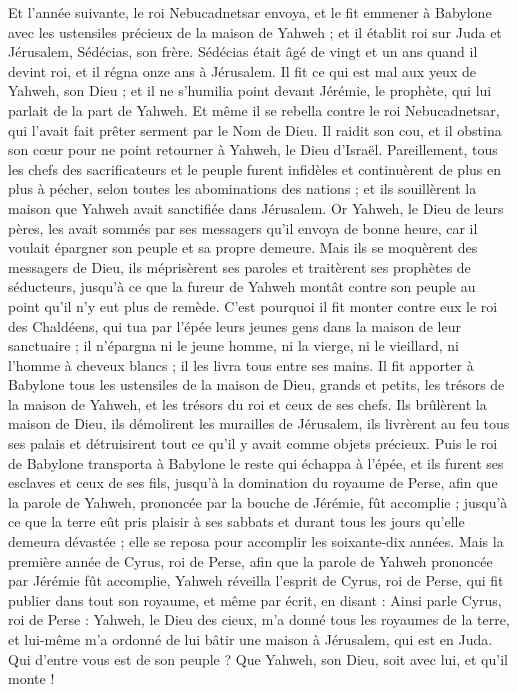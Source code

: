 \begin{multicols}{2}
Et l'année suivante, le roi Nebucadnetsar envoya, et le fit emmener à Babylone avec les ustensiles précieux de la maison de Yahweh ; et il établit roi sur Juda et Jérusalem, Sédécias, son frère.
Sédécias était âgé de vingt et un ans quand il devint roi, et il régna onze ans à Jérusalem.
Il fit ce qui est mal aux yeux de Yahweh, son Dieu ; et il ne s'humilia point devant Jérémie, le prophète, qui lui parlait de la part de Yahweh.
Et même il se rebella contre le roi Nebucadnetsar, qui l'avait fait prêter serment par le Nom de Dieu. Il raidit son cou, et il obstina son cœur pour ne point retourner à Yahweh, le Dieu d'Israël.
Pareillement, tous les chefs des sacrificateurs et le peuple furent infidèles et continuèrent de plus en plus à pécher, selon toutes les abominations des nations ; et ils souillèrent la maison que Yahweh avait sanctifiée dans Jérusalem.
Or Yahweh, le Dieu de leurs pères, les avait sommés par ses messagers qu'il envoya de bonne heure, car il voulait épargner son peuple et sa propre demeure.
Mais ils se moquèrent des messagers de Dieu, ils méprisèrent ses paroles et traitèrent ses prophètes de séducteurs, jusqu'à ce que la fureur de Yahweh montât contre son peuple au point qu'il n'y eut plus de remède.
C'est pourquoi il fit monter contre eux le roi des Chaldéens, qui tua par l'épée leurs jeunes gens dans la maison de leur sanctuaire ; il n'épargna ni le jeune homme, ni la vierge, ni le vieillard, ni l'homme à cheveux blancs ; il les livra tous entre ses mains.
Il fit apporter à Babylone tous les ustensiles de la maison de Dieu, grands et petits, les trésors de la maison de Yahweh, et les trésors du roi et ceux de ses chefs.
Ils brûlèrent la maison de Dieu, ils démolirent les murailles de Jérusalem, ils livrèrent au feu tous ses palais et détruisirent tout ce qu'il y avait comme objets précieux.
Puis le roi de Babylone transporta à Babylone le reste qui échappa à l'épée, et ils furent ses esclaves et ceux de ses fils, jusqu'à la domination du royaume de Perse,
afin que la parole de Yahweh, prononcée par la bouche de Jérémie, fût accomplie ; jusqu'à ce que la terre eût pris plaisir à ses sabbats et durant tous les jours qu'elle demeura dévastée ; elle se reposa pour accomplir les soixante-dix années.
Mais la première année de Cyrus, roi de Perse, afin que la parole de Yahweh prononcée par Jérémie fût accomplie, Yahweh réveilla l'esprit de Cyrus, roi de Perse, qui fit publier dans tout son royaume, et même par écrit, en disant :
Ainsi parle Cyrus, roi de Perse : Yahweh, le Dieu des cieux, m'a donné tous les royaumes de la terre, et lui-même m'a ordonné de lui bâtir une maison à Jérusalem, qui est en Juda. Qui d'entre vous est de son peuple ? Que Yahweh, son Dieu, soit avec lui, et qu'il monte !
\PPE{}
\end{multicols}
